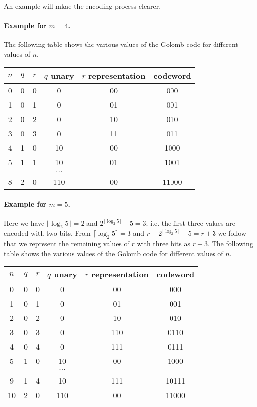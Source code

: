 An example will mkae the encoding process clearer.

\paragraph{Example for $m=4$.} The following table shows the various values of the Golomb code for different values of $n$.

\vspace*{3mm}

\begin{tabular}{c|cc|cc|c}
  $n$ & $q$ & $r$ & $q$ unary & $r$ representation & codeword \\ \hline
  0 & 0 & 0 & 0 & 00 & 000 \\
  1 & 0 & 1 & 0 & 01 & 001 \\
  2 & 0 & 2 & 0 & 10 & 010 \\
  3 & 0 & 3 & 0 & 11 & 011 \\
  4 & 1 & 0 & 10 & 00 & 1000 \\
  5 & 1 & 1 & 10 & 01 & 1001 \\
      & & & $\cdots$ & & \\
  8 & 2 & 0 & 110 & 00 & 11000
\end {tabular}
  
\vspace*{3mm}

\paragraph{Example for $m=5$.} Here we have $\lfloor \log_2 5 \rfloor = 2$ and $2^{\lceil \log_2 5 \rceil}  - 5 = 3$; i.e. the first three values are encoded with two bits. From $\lceil \log_2 5 \rceil = 3$ and $r + 2^{\lceil \log_2 5 \rceil} - 5 = r+3$ we follow that we represent the remaining values of $r$ with three bits as $r+3$. The following table shows the various values of the Golomb code for different values of $n$.

\vspace*{3mm}

\begin{tabular}{c|cc|cc|c}
  $n$ & $q$ & $r$ & $q$ unary & $r$ representation & codeword \\ \hline
  0 & 0 & 0 & 0 & 00 & 000 \\
  1 & 0 & 1 & 0 & 01 & 001 \\
  2 & 0 & 2 & 0 & 10 & 010 \\
  3 & 0 & 3 & 0 & 110 & 0110 \\
  4 & 0 & 4 & 0 & 111 & 0111 \\
  5 & 1 & 0 & 10 & 00 & 1000 \\
        & & & $\cdots$ & & \\
  9 & 1 & 4 & 10 & 111 & 10111 \\
  10 & 2 & 0 & 110 & 00 & 11000
\end {tabular}
  
\vspace*{3mm}



